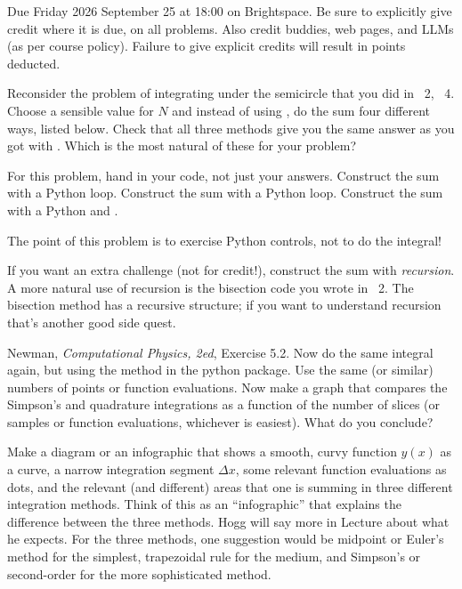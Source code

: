 \documentclass[12pt]{article}
\begin{document}
Due Friday 2026 September 25 at 18:00 on Brightspace.
Be sure to explicitly give credit where it is due, on all problems.
Also credit buddies, web pages, and LLMs (as per course policy).
Failure to give explicit credits will result in points deducted.

\begin{problem}
  Reconsider the problem of integrating under the semicircle that you did in \psname~2, \problemname~4.
  Choose a sensible value for $N$ and instead of using , do the sum four different ways, listed below.
  Check that all three methods give you the same answer as you got with .
  Which is the most natural of these for your problem?

  For this problem, hand in your code, not just your answers.
  \subpart Construct the sum with a Python  loop.
  \subpart Construct the sum with a Python  loop.
  \subpart Construct the sum with a Python  and .
\end{problem}

\begin{note}
  The point of this problem is to exercise Python controls, not to do the integral!
\end{note}

\begin{note}
  If you want an extra challenge (not for credit!), construct the sum with \emph{recursion}.
  A more natural use of recursion is the bisection code you wrote in \psname~2.
  The bisection method has a recursive structure; if you want to understand recursion that's another good side quest.
\end{note}

\begin{problem}
  \subpart Newman, \textit{Computational Physics, 2ed}, Exercise 5.2.
  \subpart Now do the same integral again, but using the  method in the python  package.
  Use the same (or similar) numbers of points or function evaluations.
  \subpart Now make a graph that compares the Simpson's and quadrature integrations as a function of the number of slices (or samples or function evaluations, whichever is easiest).
  What do you conclude?
\end{problem}

\begin{problem}
  Make a diagram or an infographic that shows a smooth, curvy function $y(x)$ as a curve,
  a narrow integration segment $\Delta x$, some relevant function evaluations as dots,
  and the relevant (and different) areas that one is summing in three different integration methods.
  Think of this as an ``infographic'' that explains the difference between the three methods.
  Hogg will say more in Lecture about what he expects.
  For the three methods, one suggestion would be midpoint or Euler's method for the simplest,
  trapezoidal rule for the medium, and Simpson's or second-order for the more sophisticated method.
\end{problem}
\end{document}

